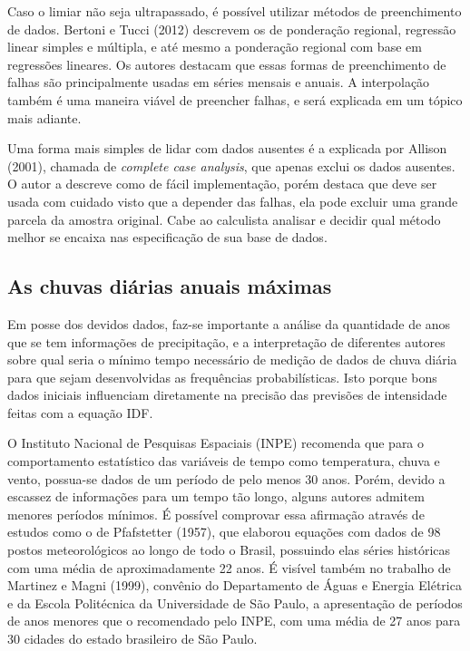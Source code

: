 Caso o limiar não seja ultrapassado, é possível utilizar métodos de preenchimento de dados. Bertoni e Tucci (2012) descrevem os de ponderação regional, regressão linear simples e múltipla, e até mesmo a ponderação regional com base em regressões lineares. Os autores destacam que essas formas de preenchimento de falhas são principalmente usadas em séries mensais e anuais. A interpolação também é uma maneira viável de preencher falhas, e será explicada em um tópico mais adiante.

Uma forma mais simples de lidar com dados ausentes é a explicada por Allison (2001), chamada de \textit{complete case analysis}, que apenas exclui os dados ausentes. O autor a descreve como de fácil implementação, porém destaca que deve ser usada com cuidado visto que a depender das falhas, ela pode excluir uma grande parcela da amostra original. Cabe ao calculista analisar e decidir qual método melhor se encaixa nas especificação de sua base de dados.

\subsection{As chuvas diárias anuais máximas}

Em posse dos devidos dados, faz-se importante a análise da quantidade de anos que se tem informações de precipitação, e a interpretação de diferentes autores sobre qual seria o mínimo tempo necessário de medição de dados de chuva diária para que sejam desenvolvidas as frequências probabilísticas. Isto porque bons dados iniciais influenciam diretamente na precisão das previsões de intensidade feitas com a equação IDF.

O Instituto Nacional de Pesquisas Espaciais (INPE) recomenda que para o comportamento estatístico das variáveis de tempo como temperatura, chuva e vento, possua-se dados de um período de pelo menos 30 anos. Porém, devido a escassez de informações para um tempo tão longo, alguns autores admitem menores períodos mínimos. É possível comprovar essa afirmação através de estudos como o de Pfafstetter (1957), que elaborou equações com dados de 98 postos meteorológicos ao longo de todo o Brasil, possuindo elas séries históricas com uma média de aproximadamente 22 anos. É visível também no trabalho de Martinez e Magni (1999), convênio do Departamento de Águas e Energia Elétrica e da Escola Politécnica da Universidade de São Paulo, a apresentação de períodos de anos menores que o recomendado pelo INPE, com uma média de 27 anos para 30 cidades do estado brasileiro de São Paulo.

